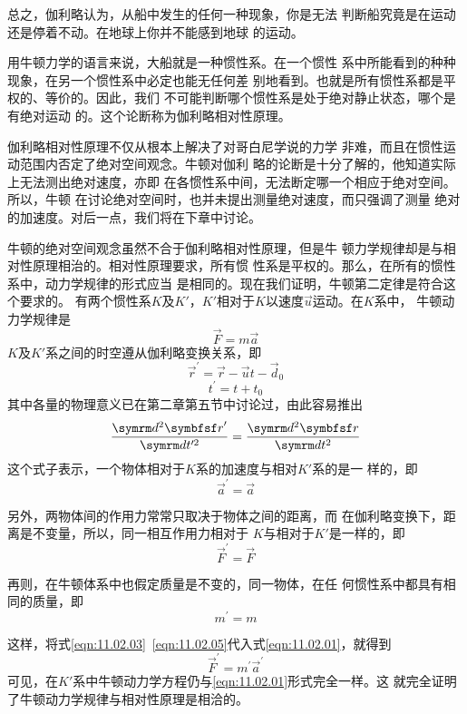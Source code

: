 总之，伽利略认为，从船中发生的任何一种现象，你是无法
判断船究竟是在运动还是停着不动。在地球上你并不能感到地球
的运动。

用牛顿力学的语言来说，大船就是一种惯性系。在一个惯性
系中所能看到的种种现象，在另一个惯性系中必定也能无任何差
别地看到。也就是所有惯性系都是平权的、等价的。因此，我们
不可能判断哪个惯性系是处于绝对静止状态，哪个是有绝对运动
的。这个论断称为伽利略相对性原理。

伽利略相对性原理不仅从根本上解决了对哥白尼学说的力学
非难，而且在惯性运动范围内否定了绝对空间观念。牛顿对伽利
略的论断是十分了解的，他知道实际上无法测出绝对速度，亦即
在各惯性系中间，无法断定哪一个相应于绝对空间。所以，牛顿
在讨论绝对空间时，也并未提出测量绝对速度，而只强调了测量
绝对的加速度。对后一点，我们将在下章中讨论。

牛顿的绝对空间观念虽然不合于伽利略相对性原理，但是牛
顿力学规律却是与相对性原理相治的。相对性原理要求，所有惯
性系是平权的。那么，在所有的惯性系中，动力学规律的形式应当
是相同的。现在我们证明，牛顿第二定律是符合这个要求的。
有两个惯性系$ K $及$ K' $，$ K' $相对于$ K $以速度$ \vec{u} $运动。在$ K $系中，
牛顿动力学规律是
\begin{equation}\label{eqn:11.02.01}
  \vec{F} = m \vec{a}
\end{equation}
$ K $及$ K' $系之间的时空遵从伽利略变换关系，即
\begin{equation}\label{eqn:11.02.02}
  \vec{r} ^ { \prime } = \vec{r} - \vec{u} t - \vec{d} _ { 0 }
\end{equation}
\begin{equation*}
  t ^ { \prime } = t + t _ { 0 }
\end{equation*}
其中各量的物理意义已在第二章第五节中讨论过，由此容易推出
\begin{equation*}
  \frac { \dif ^ { 2 } \vec{r} ^ { \prime } } { \dif t ^ { \prime 2 } } = \frac { \dif ^ { 2 } \vec{r} } { \dif t ^ { 2 } }
\end{equation*}
这个式子表示，一个物体相对于$ K $系的加速度与相对$ K' $系的是一
样的，即
\begin{equation}\label{eqn:11.02.03}
  \vec{a} ^ { \prime } = \vec{a}
\end{equation}

另外，两物体间的作用力常常只取决于物体之间的距离，而
在伽利略变换下，距离是不变量，所以，同一相互作用力相对于
$ K $与相对于$ K' $是一样的，即
\begin{equation}\label{eqn:11.02.04}
  \vec{F} ^ { \prime } = \vec{F}
\end{equation}

再则，在牛顿体系中也假定质量是不变的，同一物体，在任
何惯性系中都具有相同的质量，即
\begin{equation}\label{eqn:11.02.05}
  m ^ { \prime } = m
\end{equation}

这样，将式\eqref{eqn:11.02.03}~\eqref{eqn:11.02.05}代入式\eqref{eqn:11.02.01}，就得到
\begin{equation}\label{eqn:11.02.06}
  \vec{F} ^ { \prime } = m ^ { \prime } \vec{a} ^ { \prime }
\end{equation}
可见，在$ K' $系中牛顿动力学方程仍与\eqref{eqn:11.02.01}形式完全一样。这
就完全证明了牛顿动力学规律与相对性原理是相洽的。

